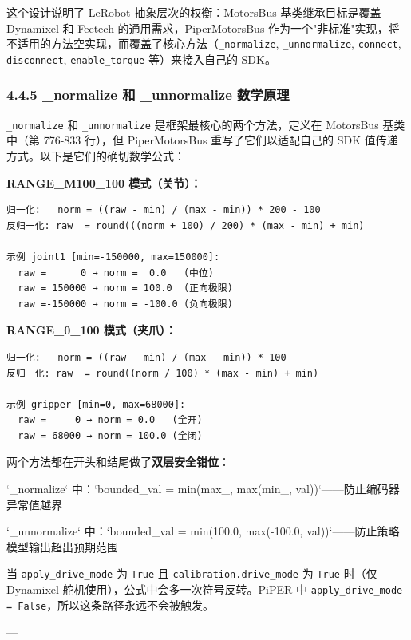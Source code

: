 \documentclass[UTF8,a4paper,11pt]{ctexart}
\begin{document}
这个设计说明了 LeRobot 抽象层次的权衡：MotorsBus 基类继承目标是覆盖 Dynamixel 和 Feetech 的通用需求，PiperMotorsBus 作为一个"非标准"实现，将不适用的方法空实现，而覆盖了核心方法（\texttt{_normalize}, \texttt{_unnormalize}, \texttt{connect}, \texttt{disconnect}, \texttt{enable_torque} 等）来接入自己的 SDK。

\subsubsection{4.4.5 _normalize 和 _unnormalize 数学原理}

\texttt{_normalize} 和 \texttt{_unnormalize} 是框架最核心的两个方法，定义在 MotorsBus 基类中（第 776-833 行），但 PiperMotorsBus 重写了它们以适配自己的 SDK 值传递方式。以下是它们的确切数学公式：

\textbf{RANGE_M100_100 模式（关节）：}

\begin{lstlisting}[language=text]
归一化:   norm = ((raw - min) / (max - min)) * 200 - 100
反归一化: raw  = round(((norm + 100) / 200) * (max - min) + min)

示例 joint1 [min=-150000, max=150000]:
  raw =      0 → norm =  0.0   (中位)
  raw = 150000 → norm = 100.0  (正向极限)
  raw =-150000 → norm = -100.0 (负向极限)
\end{lstlisting}

\textbf{RANGE_0_100 模式（夹爪）：}

\begin{lstlisting}[language=text]
归一化:   norm = ((raw - min) / (max - min)) * 100
反归一化: raw  = round((norm / 100) * (max - min) + min)

示例 gripper [min=0, max=68000]:
  raw =     0 → norm = 0.0   (全开)
  raw = 68000 → norm = 100.0 (全闭)
\end{lstlisting}

两个方法都在开头和结尾做了\textbf{双层安全钳位}：

\item[1] `_normalize` 中：`bounded_val = min(max_, max(min_, val))`——防止编码器异常值越界
\item[2] `_unnormalize` 中：`bounded_val = min(100.0, max(-100.0, val))`——防止策略模型输出超出预期范围

当 \texttt{apply_drive_mode} 为 \texttt{True} 且 \texttt{calibration.drive_mode} 为 \texttt{True} 时（仅 Dynamixel 舵机使用），公式中会多一次符号反转。PiPER 中 \texttt{apply_drive_mode = False}，所以这条路径永远不会被触发。

---
\end{document}
